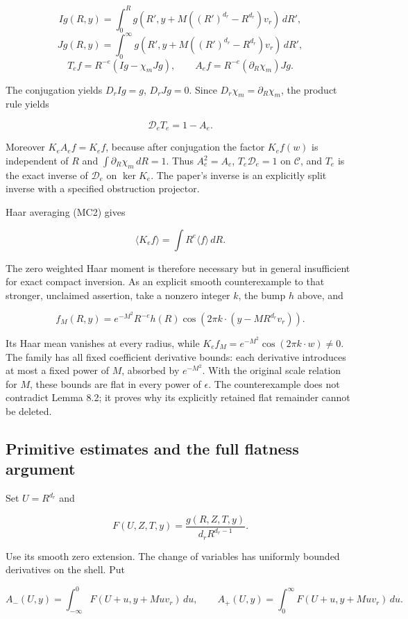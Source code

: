 \documentclass[10pt,a4paper]{article}
\begin{document}
\[
Ig(R,y)=\int_0^R g(R',y+M((R')^{d_r}-R^{d_r})v_r)\,dR',
\]
\[
Jg(R,y)=\int_0^\infty g(R',y+M((R')^{d_r}-R^{d_r})v_r)\,dR',
\]
\[
T_ef=R^{-e}(Ig-\chi_mJg),\qquad
A_ef=R^{-e}(\partial_R\chi_m)Jg.
\tag{MC5}
\]

The conjugation yields \(D_rIg=g\), \(D_rJg=0\). Since \(D_r\chi_m=\partial_R\chi_m\), the product rule yields

\[
\mathcal D_eT_e=1-A_e.
\tag{MC6}
\]

Moreover \(K_eA_ef=K_ef\), because after conjugation the factor \(K_ef(w)\) is independent of \(R\) and \(\int\partial_R\chi_m\,dR=1\). Thus \(A_e^2=A_e\), \(T_e\mathcal D_e=1\) on \(\mathcal C\), and \(T_e\) is the exact inverse of \(\mathcal D_e\) on \(\ker K_e\). The paper's inverse is an explicitly split inverse with a specified obstruction projector.

Haar averaging (MC2) gives

\[
\langle K_ef\rangle=\int R^e\langle f\rangle\,dR.
\tag{MC7}
\]

The zero weighted Haar moment is therefore necessary but in general insufficient for exact compact inversion. As an explicit smooth counterexample to that stronger, unclaimed assertion, take a nonzero integer \(k\), the bump \(h\) above, and

\[
f_M(R,y)=e^{-M^2}R^{-e}h(R)
\cos(2\pi k\cdot(y-MR^{d_r}v_r)).
\]

Its Haar mean vanishes at every radius, while \(K_ef_M=e^{-M^2}\cos(2\pi k\cdot w)\ne0\). The family has all fixed coefficient derivative bounds: each derivative introduces at most a fixed power of \(M\), absorbed by \(e^{-M^2}\). With the original scale relation for \(M\), these bounds are flat in every power of \(\epsilon\). The counterexample does not contradict Lemma 8.2; it proves why its explicitly retained flat remainder cannot be deleted.

\subsection{Primitive estimates and the full flatness argument}

Set \(U=R^{d_r}\) and

\[
F(U,Z,T,y)=\frac{g(R,Z,T,y)}{d_rR^{d_r-1}}.
\]

Use its smooth zero extension. The change of variables has uniformly bounded derivatives on the shell. Put

\[
A_-(U,y)=\int_{-\infty}^0 F(U+u,y+Muv_r)\,du,
\qquad
A_+(U,y)=\int_0^\infty F(U+u,y+Muv_r)\,du.
\]
\end{document}
